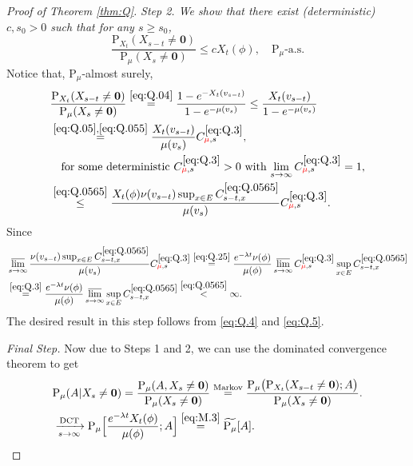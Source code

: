 \documentclass[12pt,a4paper]{amsart}
\numberwithin{equation}{section}
\theoremstyle{plain}
\theoremstyle{definition}
\theoremstyle{remark}
\begin{document}
\begin{proof}[Proof of Theorem \ref{thm:Q}]
\emph{
	Step 2. We show that there exist (deterministic) $c,s_0>0$ such that for any $s\geq s_0$,
	\begin{equation} \label{eq:Q.2}
		\frac{\mathrm P_{X_t}(X_{s-t} \neq \mathbf 0)}{\mathrm P_\mu(X_{s} \neq \mathbf 0)}
		\leq cX_t(\phi), \quad \mathrm P_\mu\text{-a.s.}
	\end{equation}
}
	Notice that, $\mathrm P_\mu$-almost surely,
	\begin{align}
		& \frac{\mathrm P_{X_t}(X_{s-t}\neq \mathbf 0)}{\mathrm P_\mu(X_s\neq \mathbf 0)}
		\overset{\eqref{eq:Q.04}}= \frac{1-e^{- X_t(v_{s-t}) }}{1-e^{- \mu(v_s) }}
		\leq \frac{X_t(v_{s-t}) }{1-e^{- \mu(v_s) }}
		\\\label{eq:Q.3}&\overset{\eqref{eq:Q.05},\eqref{eq:Q.055}}= \frac{X_t(v_{s-t}) }{ \mu(v_s)} C_{{\color{red}\mu} ,s}^{\eqref{eq:Q.3}},
		\\& \quad \text{for some deterministic $C_{{\color{red}\mu} ,s}^{\eqref{eq:Q.3}}>0$ with $\lim_{s\to \infty} C_{{\color{red}\mu},s}^{\eqref{eq:Q.3}} = 1$,}
		\\\label{eq:Q.4}&\overset{\eqref{eq:Q.0565}}\leq \frac{X_t(\phi) \nu(v_{s-t}) \sup_{x\in E} C_{s-t,x}^{\eqref{eq:Q.0565}}}{ \mu(v_s)} C_{{\color{red}\mu},s}^{\eqref{eq:Q.3}}.
	\end{align}
Since
	\begin{align}
		&  \varlimsup_{s\to \infty}\frac{\nu(v_{s-t}) \sup_{x\in E} C_{s-t,x}^{\eqref{eq:Q.0565}}}{ \mu(v_s)} C_{{\color{red}\mu} ,s}^{\eqref{eq:Q.3}}
		\overset{\eqref{eq:Q.25}} = \frac{e^{-\lambda t} \nu(\phi)}{\mu(\phi)} \varlimsup_{s\to \infty}C_{{\color{red}\mu} ,s}^{\eqref{eq:Q.3}} \sup_{x\in E}C_{s-t,x}^{\eqref{eq:Q.0565}}
		\\\label{eq:Q.5}&\overset{\eqref{eq:Q.3}} = \frac{e^{-\lambda t} \nu(\phi)}{\mu(\phi)} \varlimsup_{s\to \infty} \sup_{x\in E}C_{s-t,x}^{\eqref{eq:Q.0565}}
		\overset{\eqref{eq:Q.0565}}< \infty.
	\end{align}
	The desired result in this step follows from \eqref{eq:Q.4} and \eqref{eq:Q.5}.
	
	\emph{Final Step.} Now due to Steps 1 and 2, we can use the dominated convergence theorem to get
\begin{align}
&  \mathrm P_\mu(A|X_s\neq \mathbf 0)
	=\frac{\mathrm P_\mu(A, X_s \neq \mathbf 0)}{\mathrm P_\mu(X_s\neq \mathbf 0)}
	\overset{\text{Markov}}=\frac{\mathrm P_\mu\big(\mathrm P_{X_t}(X_{s-t} \neq \mathbf 0);A\big)}{\mathrm P_\mu(X_s\neq \mathbf 0)}.
	\\&\xrightarrow[s\to \infty]{\text{DCT}} \mathrm P_\mu\Big[\frac{e^{-\lambda t}X_t(\phi)}{\mu(\phi) }; A\Big]
	\overset{\eqref{eq:M.3}} = \widetilde{\mathrm P_\mu}[A].
	\qedhere
\end{align}
\end{proof}
\end{document}
